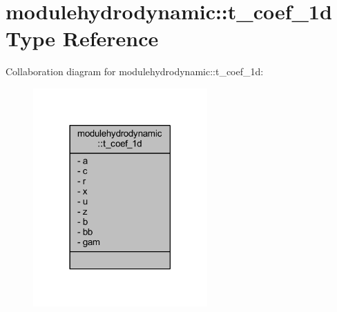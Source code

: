\hypertarget{structmodulehydrodynamic_1_1t__coef__1d}{}\section{modulehydrodynamic\+:\+:t\+\_\+coef\+\_\+1d Type Reference}
\label{structmodulehydrodynamic_1_1t__coef__1d}


Collaboration diagram for modulehydrodynamic\+:\+:t\+\_\+coef\+\_\+1d\+:\nopagebreak
\begin{figure}[H]
\begin{center}
\leavevmode
\includegraphics[width=189pt]{structmodulehydrodynamic_1_1t__coef__1d__coll__graph}
\end{center}
\end{figure}
